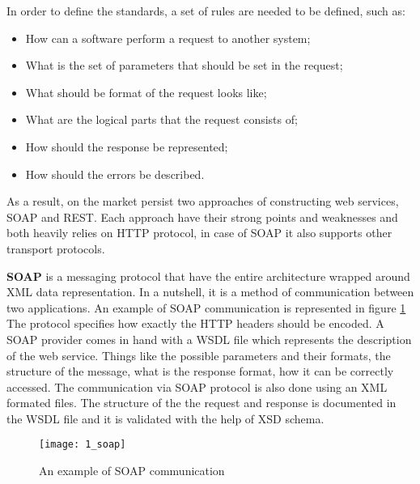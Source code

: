 \clearpage
In order to define the standards, a set of rules are needed to be defined, such as:
\begin{itemize}
    \item How can a software perform a request to another system;
    \item What is the set of parameters that should be set in the request;
    \item What should be format of the request looks like;
    \item What are the logical parts that the request consists of;
    \item How should the response be represented;
    \item How should the errors be described.
\end{itemize}

As a result, on the market persist two approaches of constructing web services, SOAP and REST. Each approach have their strong points and weaknesses and both heavily relies on HTTP protocol, in case of SOAP it also supports other transport protocols.

\textbf{SOAP} is a messaging protocol that have the entire architecture wrapped around XML data representation. In a nutshell, it is a method of communication between two applications. An example of SOAP communication is represented in figure \mbox{\ref{soap}} The protocol specifies how exactly the HTTP headers should be encoded. A SOAP provider comes in hand with a WSDL file which represents the description of the web service. Things like the possible parameters and their formats, the structure of the message, what is the response format, how it can be correctly accessed. The communication via SOAP protocol is also done using an XML formated files. The structure of the the request and response is documented in the WSDL file and it is validated with the help of XSD schema.

\begin{figure}[!ht]
\centering
\texttt{[image: 1\_soap]}
\caption{An example of SOAP communication}\label{soap}
\end{figure}


